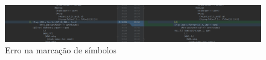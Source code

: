 \begin{figure}[!h]
    \centering
    \includegraphics[width=\textwidth,scale=1.5]{imagens/erro_escrita_1340.png}
    \caption[Erro na marcação de símbolos]{Erro na marcação de símbolos}
    \label{fig:bosque_erro_simbolos}
\end{figure}